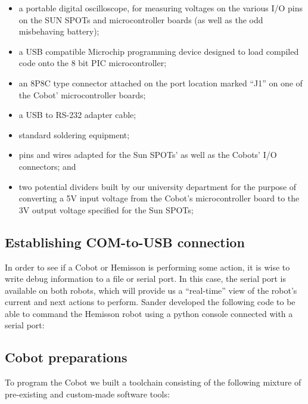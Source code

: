 \documentclass[a4paper,10pt]{article} %
\begin{document}
\begin{itemize}
    \item a portable digital oscilloscope, for measuring voltages on the various
    I/O pins on the SUN SPOTs and microcontroller boards (as well as the odd
    misbehaving battery);
    \item a USB compatible Microchip programming device designed to load compiled code
    onto the 8 bit PIC microcontroller;
    \item an 8P8C type connector attached on the port location marked ``J1'' on
    one of the Cobot' microcontroller boards;
    \item a USB to RS-232 adapter cable;
    \item standard soldering equipment;
    \item pins and wires adapted for the Sun SPOTs' as well as the Cobots' I/O
    connectors; and
    \item two potential dividers built by our university department for the
    purpose of converting a 5V input voltage from the Cobot's microcontroller
    board to the 3V output voltage specified for the Sun SPOTs;
\end{itemize}

\subsection{Establishing COM-to-USB connection} %
\label{sub:Establishing COM-to-USB connection}

In order to see if a Cobot or Hemisson is performing some action, it is wise to
write debug information to a file or serial port. In this case, the serial port
is available on both robots, which will provide us a ``real-time'' view of the
robot's current and next actions to perform. Sander developed the following code
to be able to command the Hemisson robot using a python console connected with a
serial port:





\subsection{Cobot preparations} %

To program the Cobot we built a toolchain consisting of the following mixture of pre-existing and custom-made software tools:
\end{document}
